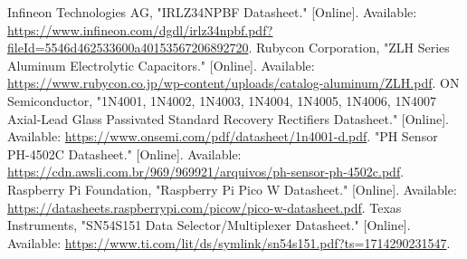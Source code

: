 \documentclass[12pt]{article} %
\begin{document}
\begin{thebibliography}{99}
     Infineon Technologies AG, "IRLZ34NPBF Datasheet." [Online]. Available: \url{https://www.infineon.com/dgdl/irlz34npbf.pdf?fileId=5546d462533600a40153567206892720}.
     Rubycon Corporation, "ZLH Series Aluminum Electrolytic Capacitors." [Online]. Available: \url{https://www.rubycon.co.jp/wp-content/uploads/catalog-aluminum/ZLH.pdf}.
     ON Semiconductor, "1N4001, 1N4002, 1N4003, 1N4004, 1N4005, 1N4006, 1N4007 Axial-Lead Glass Passivated Standard Recovery Rectifiers Datasheet." [Online]. Available: \url{https://www.onsemi.com/pdf/datasheet/1n4001-d.pdf}.
     "PH Sensor PH-4502C Datasheet." [Online]. Available: \url{https://cdn.awsli.com.br/969/969921/arquivos/ph-sensor-ph-4502c.pdf}.
     Raspberry Pi Foundation, "Raspberry Pi Pico W Datasheet." [Online]. Available: \url{https://datasheets.raspberrypi.com/picow/pico-w-datasheet.pdf}.
     Texas Instruments, "SN54S151 Data Selector/Multiplexer Datasheet." [Online]. Available: \url{https://www.ti.com/lit/ds/symlink/sn54s151.pdf?ts=1714290231547}.
\end{thebibliography}
\end{document}
